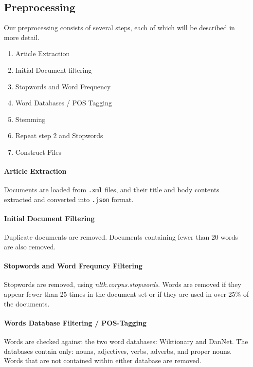 \subsection{Preprocessing}\label{subsec:prepro}

Our preprocessing consists of several steps, each of which will be described in more detail.

\begin{enumerate}
	\item Article Extraction
	\item Initial Document filtering
	\item Stopwords and Word Frequency
	\item Word Databases / POS Tagging
	\item Stemming
	\item Repeat step 2 and Stopwords
	\item Construct Files
\end{enumerate}

\paragraph{Article Extraction}
Documents are loaded from \texttt{.xml} files, and their title and body contents extracted and converted into \texttt{.json} format.

\paragraph{Initial Document Filtering}
Duplicate documents are removed. Documents containing fewer than 20 words are also removed.

\paragraph{Stopwords and Word Frequncy Filtering}
Stopwords are removed, using \emph{nltk.corpus.stopwords}. 
Words are removed if they appear fewer than 25 times in the document set or if they are used in over 25\% of the documents.

\paragraph{Words Database Filtering / POS-Tagging}
Words are checked against the two word databases: Wiktionary and DanNet. 
The databases contain only: nouns, adjectives, verbs, adverbs, and proper nouns. 
Words that are not contained within either database are removed.

